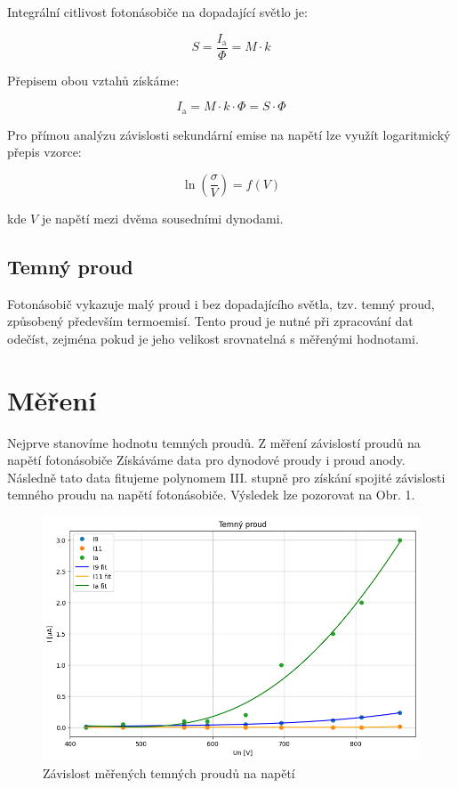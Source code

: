 \documentclass[czech,11pt,a4paper]{article}
\begin{document}
\begin{multicols}{2}
		Integrální citlivost fotonásobiče na dopadající světlo je:
		
		\begin{equation} S = \frac{I_{\text{a}}}{\Phi} = M \cdot k \end{equation}
		
		Přepisem obou vztahů získáme:
		
		\begin{equation} I_{\text{a}} = M \cdot k \cdot \Phi = S \cdot \Phi \end{equation}
		
		Pro přímou analýzu závislosti sekundární emise na napětí lze využít logaritmický přepis vzorce:
		
		\begin{equation} \ln\left(\frac{\sigma}{V}\right) = f(V) \end{equation}
		
		kde $V$ je napětí mezi dvěma sousedními dynodami.
		
		\subsection{Temný proud}
		Fotonásobič vykazuje malý proud i bez dopadajícího světla, tzv. temný proud, způsobený především termoemisí. Tento proud je nutné při zpracování dat odečíst, zejména pokud je jeho velikost srovnatelná s měřenými hodnotami.
		
		\section{Měření}
		Nejprve stanovíme hodnotu temných proudů. Z měření závislostí proudů na napětí fotonásobiče Získáváme data pro dynodové proudy i proud anody. Následně tato data fitujeme polynomem III. stupně pro získání spojité závislosti temného proudu na napětí fotonásobiče. Výsledek lze pozorovat na Obr. 1.
		\begin{figure}[H]
			\centering
			\includegraphics[width=0.9\linewidth]{tp}
			\caption{Závislost měřených temných proudů na napětí}
			

\end{figure}
\end{multicols}
\end{document}
